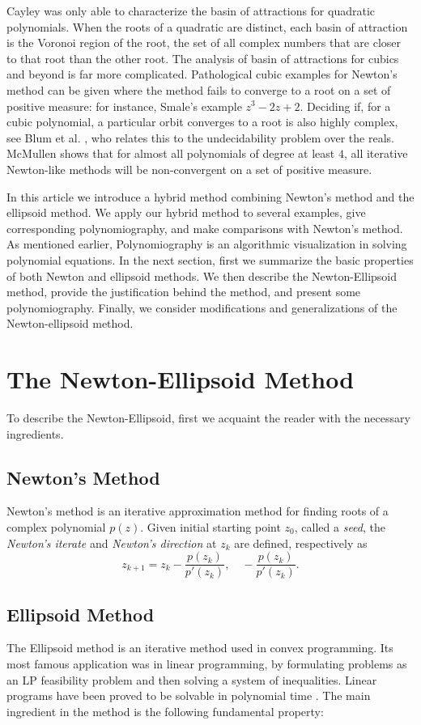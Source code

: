 \documentclass{article}
\begin{document}
Cayley was only able to characterize the basin of attractions for quadratic polynomials. When the roots of a quadratic are distinct, each basin of attraction is the Voronoi region of the root,  the set of all complex numbers that are closer to that root than the other root. The analysis of basin of attractions for cubics and beyond is far more complicated.  Pathological cubic examples for Newton's method can be given where the method fails to converge to a root on a set of positive measure: for instance, Smale's example $z^3-2z+2$.  Deciding if, for a cubic polynomial, a particular orbit converges to a root is also highly complex, see Blum et al. \cite{Blum}, who relates this to the undecidability problem over the reals. McMullen \cite{McMullen87} shows that for almost all polynomials of degree at least $4$,  all iterative Newton-like methods will be non-convergent on a set of positive measure.

In this article we introduce a hybrid method combining Newton's method and the ellipsoid method.  We apply our hybrid method to several examples, give  corresponding polynomiography, and make comparisons with Newton's method.  As mentioned earlier, Polynomiography is an algorithmic visualization in solving polynomial equations. In the next section, first we summarize the basic properties of both Newton and ellipsoid methods.  We then describe the Newton-Ellipsoid method, provide the justification behind the method, and present some polynomiography.  Finally, we consider modifications and generalizations of the Newton-ellipsoid method.

\section{The Newton-Ellipsoid Method}

To describe the Newton-Ellipsoid, first we acquaint the reader with the necessary ingredients.

\subsection{Newton's Method}
Newton’s method is an iterative approximation method for finding roots of a complex polynomial $p(z)$. Given initial starting point $z_0$, called a  {\it seed}, the  \textit{Newton's iterate} and \textit{Newton's direction}
at $z_k$ are defined, respectively  as
$$z_{k+1} = z_k - \frac{p(z_k)}{p'(z_k)}, \quad - \frac{p(z_k)}{p'(z_k)}.$$

\subsection{Ellipsoid Method}
The Ellipsoid method is an iterative method used in convex programming. Its most famous application was in linear programming, by formulating problems as an LP feasibility problem and then solving a system of inequalities.  Linear programs have been proved to be solvable in polynomial time \cite{kha79}. The main ingredient in the method is the following fundamental property:
\end{document}
